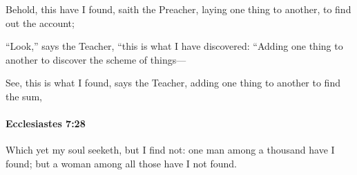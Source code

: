 			\begin{versebox}
					\item[BHS] 
					\item[LXX] 
					\item[ASV] Behold, this have I found, saith the Preacher, laying one thing to another, to find out the account;
					\item[NIV] “Look,” says the Teacher, “this is what I have discovered: “Adding one thing to another to discover the scheme of things—
					\item[NRSV] See, this is what I found, says the Teacher, adding one thing to another to find the sum,
			\end{versebox}

		\paragraph{Ecclesiastes 7:28} %
			\label{ECCLESIASTES-7-28}

			Which yet my soul seeketh, but I find not: one man among a thousand have I found; but a woman among all those have I not found.

